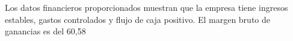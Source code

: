
                Los datos financieros proporcionados muestran que la empresa tiene ingresos estables, gastos controlados y flujo de caja positivo. El margen bruto de ganancias es del 60,58%
